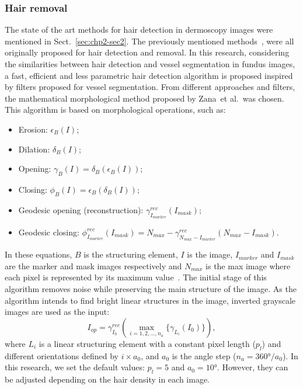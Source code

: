 \subsubsection{Hair removal}\label{chp3-subsubsecHair}
The state of the art methods for hair detection in dermoscopy images were mentioned in Sect.~\ref{sec:chp2-sec2}.
The previously mentioned methods~\cite{Lee1997, Kiani2011,Abbas2011a,Abbas2012b,Fleming1998,Schmid-Saugeon2003,Nguyen2010,Debeir1999,Wighton2011,Chung2000,Barcelos2009,Xie2009}, were all originally proposed for hair detection and removal.
In this research, considering the similarities between hair detection and vessel segmentation in fundus images, a fast, efficient and less parametric hair detection algorithm is proposed inspired by filters proposed for vessel segmentation.
From different approaches and filters, the mathematical morphological method proposed by Zana~et al.\,\cite{zana2001segmentation, giancardo2011automated} was chosen.
This algorithm is based on morphological operations, such as:
\begin{itemize}
\item[]Erosion: $\epsilon_{B}(I)$;
\item[]Dilation: $\delta_{B}(I)$;
\item[]Opening: $\gamma_{B}(I) = \delta_{B}(\epsilon_{B}(I))$;
\item[]Closing: $\phi_{B}(I) = \epsilon_{B}(\delta_{B}(I))$;
\item[]Geodesic opening (reconstruction): $\gamma_{I_{marker}}^{rec}(I_{mask})$;
\item[]Geodesic closing: $\phi_{I_{marker}}^{rec}(I_{mask}) = N_{max} - \gamma_{N_{max}-I_{marker}}^{rec}(N_{max} - I_{mask})$.
\end{itemize}
\noindent In these equations, $B$ is the structuring element, $I$ is the image, $I_{marker}$ and $I_{mask}$ are the marker and mask images respectively and $N_{max}$ is the max image where each pixel is represented by its maximum value~\cite{vincent1993morphological}.
The initial stage of this algorithm removes noise while preserving the main structure of the image.
As the algorithm intends to find bright linear structures in the image, inverted grayscale images are used as the input:
\begin{equation}
I_{op} = \gamma_{I_{0}}^{rec}(\max\limits_{i=1,2,...,n_{a}}\{\gamma_{L_{i}}(I_{0})\}),
\end{equation}
\noindent where $L_{i}$ is a linear structuring element with a constant pixel length ($p_{l}$) and different orientations defined by $i \times a_{0}$, and $a_{0}$ is the angle step ($n_{a} = \ang{360}/a_{0}$).
In this research, we set the default values: $p_{l} = 5$ and $a_{0} = \ang{10}$.
However, they can be adjusted depending on the hair density in each image.

